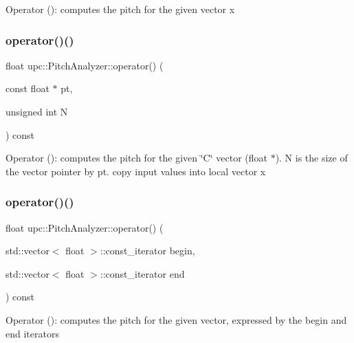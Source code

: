Operator ()\+: computes the pitch for the given vector x \mbox{\label{classupc_1_1PitchAnalyzer_ac4fe50035ebbb1602ab9f4c90755ba0a}} 
\subsubsection{\texorpdfstring{operator()()}{operator()()}\hspace{0.1cm}{\footnotesize\ttfamily [2/3]}}
{\footnotesize\ttfamily float upc\+::\+Pitch\+Analyzer\+::operator() (\begin{DoxyParamCaption}\item[{const float $\ast$}]{pt,  }\item[{unsigned int}]{N }\end{DoxyParamCaption}) const\hspace{0.3cm}{\ttfamily [inline]}}

Operator ()\+: computes the pitch for the given \char`\"{}\+C\char`\"{} vector (float $\ast$). N is the size of the vector pointer by pt. copy input values into local vector x \mbox{\label{classupc_1_1PitchAnalyzer_a6ae2aaad64d2768c7869f01d25e9d5e6}} 
\subsubsection{\texorpdfstring{operator()()}{operator()()}\hspace{0.1cm}{\footnotesize\ttfamily [3/3]}}
{\footnotesize\ttfamily float upc\+::\+Pitch\+Analyzer\+::operator() (\begin{DoxyParamCaption}\item[{std\+::vector$<$ float $>$\+::const\+\_\+iterator}]{begin,  }\item[{std\+::vector$<$ float $>$\+::const\+\_\+iterator}]{end }\end{DoxyParamCaption}) const\hspace{0.3cm}{\ttfamily [inline]}}

Operator ()\+: computes the pitch for the given vector, expressed by the begin and end iterators \mbox{\label{classupc_1_1PitchAnalyzer_ac33887654b62b3f90c3de231ec187d94}} 
